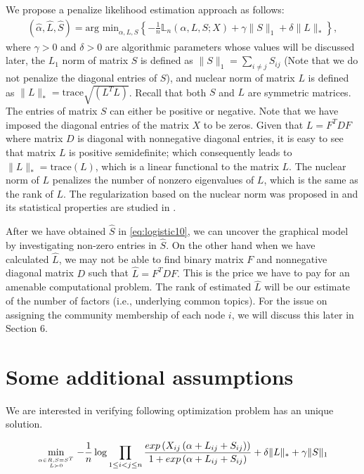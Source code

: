\documentclass{article}
\begin{document}
We propose a penalize likelihood estimation approach as follows:
\begin{eqnarray}
\label{eq:logistic10}
(\hat{\alpha}, \hat{L}, \hat{S})
= \mbox{arg min}_{\alpha, L, S} \left\{
-\frac{1}{n} \mathbb{L}_n(\alpha,  L, S; X) + \gamma \|S\|_1
+ \delta \|L\|_\ast\right\},
\end{eqnarray}
where $\gamma>0$ and $\delta>0$ are algorithmic parameters whose values will be discussed later,
the $L_1$ norm of matrix $S$ is defined as $\|S\|_1 = \sum_{i\neq j} S_{ij}$ (Note that we do not penalize the diagonal entries of $S$), and nuclear norm of matrix $L$ is defined as $\|L\|_\ast = {\mbox{trace}\sqrt{(L^T L)}}$. Recall that both $S$ and $L$ are symmetric matrices. The entries of matrix $S$ can either be positive or negative. Note that we have imposed the diagonal entries of the matrix $X$ to be zeros. Given that $L = F^T D F$ where matrix $D$ is diagonal with nonnegative diagonal entries, it is easy to see that matrix $L$ is positive semidefinite; which consequently leads to $\|L\|_\ast = \mbox{trace}(L)$, which is a linear functional to the matrix $L$.
The nuclear norm of $L$ penalizes the number of nonzero eigenvalues of $L$, which is the same as the rank
of $L$.
The regularization based on the nuclear norm was proposed in \cite{fazel2001rank}
and its statistical properties are studied in \cite{bach2008consistency}.

After we have obtained $\hat{S}$ in \eqref{eq:logistic10}, we can uncover the graphical model by investigating non-zero entries in $\hat{S}$.
On the other hand when we have calculated $\hat{L}$, we may not be able to find binary matrix $F$ and nonnegative diagonal matrix $D$ such that $\hat{L} = F^T D F.$
This is the price we have to pay for an amenable computational problem. The rank of estimated $\hat{L}$ will be our estimate of the number of factors (i.e., underlying common topics). For the issue on assigning the community membership of each node $i$, we will discuss this later in Section 6.

\section{ Some additional assumptions }
We are interested in verifying following optimization problem has an unique solution.

\begin{align*}
\min\limits_{\alpha \in R, S = S^T \atop L \succ 0}   
-\frac{1}{n} \log \prod_{1\le i< j\le n}\frac{exp\left(X_{ij}\left(\alpha+
L_{ij}+S_{ij}\right)\right)}{1+exp\left(\alpha+
L_{ij}+S_{ij}\right)} + \delta \|L\|_\ast + \gamma \|S\|_1
\end{align*}
\end{document}
